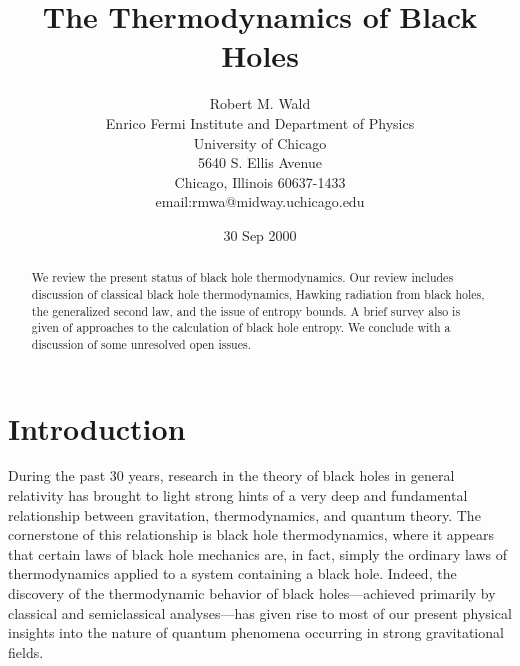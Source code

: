 \documentclass[12pt]{article}
\newcommand{\keywords}[1]{}
\begin{document}
\title{The Thermodynamics of Black Holes}

\author{Robert M. Wald\\
         Enrico Fermi Institute and Department of Physics\\
         University of Chicago\\
         5640 S. Ellis Avenue\\
         Chicago, Illinois 60637-1433\\
         email:rmwa@midway.uchicago.edu}
\date{30 Sep 2000}
\maketitle

\begin{abstract}

We review the present status of black hole thermodynamics. Our
review includes discussion of classical black hole thermodynamics,
Hawking radiation from black holes, the generalized second law, and
the issue of entropy bounds. A brief survey also is given of
approaches to the calculation of black hole entropy. We conclude with
a discussion of some unresolved open issues.

\end{abstract}

\keywords{black hole thermodynamics, black holes, event horizons,
Hawking radiation, quantum field theory, quantum gravity, Euclidean
methods, variational methods, statistical mechanics, thermodynamics,
Killing horizons, generalized second law, entropy bounds}

\newpage


\section{Introduction}
\label{section:intro}

During the past 30 years, research in the theory of black holes in
general relativity has brought to light strong hints of a very deep
and fundamental relationship between gravitation, thermodynamics, and
quantum theory. The cornerstone of this relationship is black hole
thermodynamics, where it appears that certain laws of black hole
mechanics are, in fact, simply the ordinary laws of thermodynamics
applied to a system containing a black hole. Indeed, the discovery of
the thermodynamic behavior of black holes---achieved primarily by
classical and semiclassical analyses---has given rise to most of our
present physical insights into the nature of quantum phenomena
occurring in strong gravitational fields.
\end{document}
